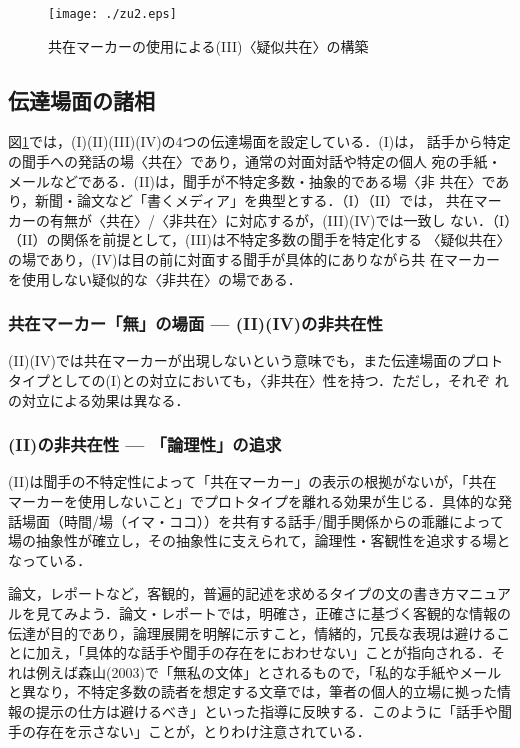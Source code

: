 \documentclass[japanese]{jnlp_1.3c}
\begin{document}
\begin{figure}[htbp]
 \begin{center}
   \texttt{[image: ./zu2.eps]}
  \caption{\label{kyozai2}共在マーカーの使用による(III)〈疑似共在〉の構築}
 \end{center}
\end{figure}

\subsection{伝達場面の諸相}

図\ref{kyozai2}では，(I)(II)(III)(IV)の4つの伝達場面を設定している．(I)は，
話手から特定の聞手への発話の場〈共在〉であり，通常の対面対話や特定の個人
宛の手紙・メールなどである．(II)は，聞手が不特定多数・抽象的である場〈非
共在〉であり，新聞・論文など「書くメディア」を典型とする．（I）（II）では，
共在マーカーの有無が〈共在〉/〈非共在〉に対応するが，(III)(IV)では一致し
ない．（I）（II）の関係を前提として，(III)は不特定多数の聞手を特定化する
〈疑似共在〉の場であり，(IV)は目の前に対面する聞手が具体的にありながら共
在マーカーを使用しない疑似的な〈非共在〉の場である．

\subsubsection{共在マーカー「無」の場面 --- (II)(IV)の非共在性}

(II)(IV)では共在マーカーが出現しないという意味でも，また伝達場面のプロト
タイプとしての(I)との対立においても，〈非共在〉性を持つ．ただし，それぞ
れの対立による効果は異なる．

\subsubsection{(II)の非共在性 --- 「論理性」の追求}\label{tuikyu}

(II)は聞手の不特定性によって「共在マーカー」の表示の根拠がないが，「共在
マーカーを使用しないこと」でプロトタイプを離れる効果が生じる．具体的な発
話場面（時間/場（イマ・ココ））を共有する話手/聞手関係からの乖離によって
場の抽象性が確立し，その抽象性に支えられて，論理性・客観性を追求する場と
なっている．

論文，レポートなど，客観的，普遍的記述を求めるタイプの文の書き方マニュア
ルを見てみよう．論文・レポートでは，明確さ，正確さに基づく客観的な情報の
伝達が目的であり，論理展開を明解に示すこと，情緒的，冗長な表現は避けるこ
とに加え，「具体的な話手や聞手の存在をにおわせない」ことが指向される．そ
れは例えば森山(2003)で「無私の文体」とされるもので，「私的な手紙やメール
と異なり，不特定多数の読者を想定する文章では，筆者の個人的立場に拠った情
報の提示の仕方は避けるべき」といった指導に反映する．このように「話手や聞
手の存在を示さない」ことが，とりわけ注意されている．
\end{document}
